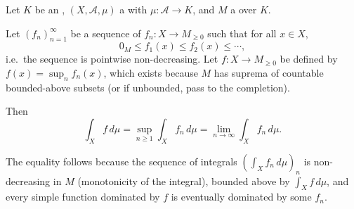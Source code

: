 \begin{theorem} \label{theorem:monotone_convergence_theorem_for_module_valued_functions}
Let $K$ be an , $(X,\mathcal{A},\mu)$ a  with $\mu : \mathcal{A} \to K$, and $M$ a  over $K$.

Let $(f_n)_{n=1}^\infty$ be a sequence of  $f_n : X \to M_{\geq 0}$ such that for all $x \in X$,
$$0_M \leq f_1(x) \leq f_2(x) \leq \cdots,$$
i.e.\ the sequence is pointwise non-decreasing. Let $f : X \to M_{\geq 0}$ be defined by $f(x) = \sup_{n} f_n(x)$, which exists because $M$ has suprema of countable bounded-above subsets (or if unbounded, pass to the completion).

Then
$$\int_X f \, d\mu = \sup_{n \geq 1} \int_X f_n \, d\mu = \lim_{n \to \infty} \int_X f_n \, d\mu.$$

The equality follows because the sequence of integrals $\left(\int_X f_n \, d\mu\right)_{n}$ is non-decreasing in $M$ (monotonicity of the integral), bounded above by $\int_X f \, d\mu$, and every simple function dominated by $f$ is eventually dominated by some $f_n$.
\end{theorem}
